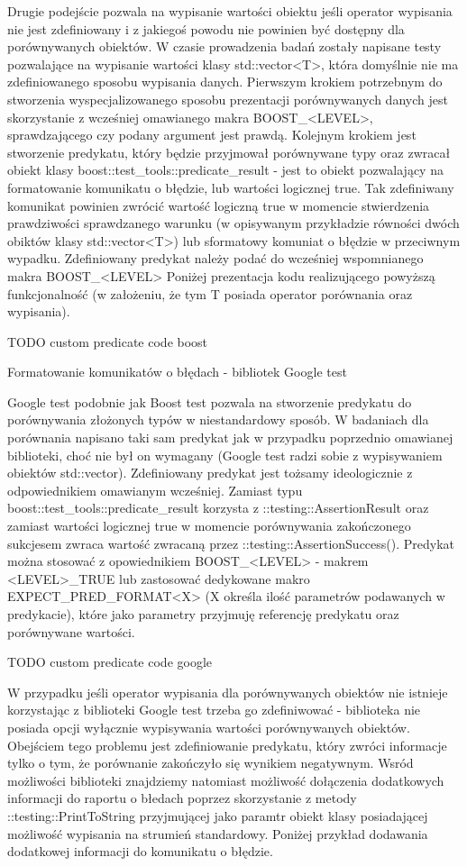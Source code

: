 \documentclass[12pt,a4paper,notitlepage]{report}
\begin{document}
Drugie podejście pozwala na wypisanie wartości obiektu jeśli operator wypisania nie jest zdefiniowany i z jakiegoś powodu nie powinien być dostępny dla porównywanych obiektów.
W czasie prowadzenia badań zostały napisane testy pozwalające na wypisanie wartości klasy std::vector<T>, która domyślnie nie ma zdefiniowanego sposobu wypisania danych.
Pierwszym krokiem potrzebnym do stworzenia wyspecjalizowanego sposobu prezentacji porównywanych danych jest skorzystanie z wcześniej omawianego makra BOOST_<LEVEL>, sprawdzającego czy podany argument jest prawdą. Kolejnym krokiem jest stworzenie predykatu, który będzie przyjmował porównywane typy oraz zwracał obiekt klasy boost::test_tools::predicate_result - jest to obiekt pozwalający na formatowanie komunikatu o błędzie, lub wartości logicznej true.
Tak zdefiniwany komunikat powinien zwrócić wartość logiczną true w momencie stwierdzenia prawdziwości sprawdzanego warunku (w opisywanym przykładzie równości dwóch obiktów klasy std::vector<T>) lub sformatowy komuniat o błędzie w przeciwnym wypadku.
Zdefiniowany predykat należy podać do wcześniej wspomnianego makra BOOST_<LEVEL>
Poniżej prezentacja kodu realizującego powyższą funkcjonalność (w założeniu, że tym T posiada operator porównania oraz wypisania).

TODO custom predicate code boost

Formatowanie komunikatów o błędach - bibliotek Google test

Google test podobnie jak Boost test pozwala na stworzenie predykatu do porównywania złożonych typów w niestandardowy sposób. W badaniach dla porównania napisano taki sam predykat jak w przypadku poprzednio omawianej biblioteki, choć nie był on wymagany (Google test radzi sobie z wypisywaniem obiektów std::vector).
Zdefiniowany predykat jest tożsamy ideologicznie z odpowiednikiem omawianym wcześniej. Zamiast typu boost::test_tools::predicate_result korzysta z ::testing::AssertionResult oraz zamiast wartości logicznej true w momencie porównywania zakończonego sukcjesem zwraca wartość zwracaną przez ::testing::AssertionSuccess().
Predykat można stosować z opowiednikiem BOOST_<LEVEL> - makrem <LEVEL>_TRUE lub zastosować dedykowane makro EXPECT_PRED_FORMAT<X> (X określa ilość parametrów podawanych w predykacie), które jako parametry przyjmuję referencję predykatu oraz porównywane wartości.

TODO custom predicate code google

W przypadku jeśli operator wypisania dla porównywanych obiektów nie istnieje korzystając z biblioteki Google test trzeba go zdefiniwować - biblioteka nie posiada opcji wyłącznie wypisywania wartości porównywanych obiektów. Obejściem tego problemu jest zdefiniowanie predykatu, który zwróci informacje tylko o tym, że porównanie zakończyło się wynikiem negatywnym.
Wsród możliwości biblioteki znajdziemy natomiast możliwość dołączenia dodatkowych informacji do raportu o błedach poprzez skorzystanie z metody ::testing::PrintToString przyjmującej jako paramtr obiekt klasy posiadającej możliwość wypisania na strumień standardowy.
Poniżej przykład dodawania dodatkowej informacji do komunikatu o błędzie.
\end{document}
